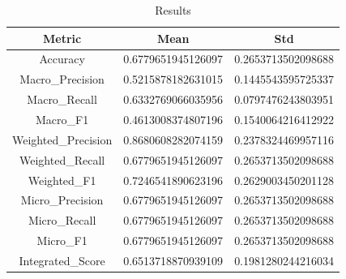 \begin{table}[htbp]
\centering
\caption{Results}
\label{tab:csv}
\small
\setlength{\tabcolsep}{4pt}
\begin{tabular}{|c|c|c|}
\hline
Metric & Mean & Std \\
\hline
Accuracy & 0.6779651945126097 & 0.2653713502098688 \\
Macro_Precision & 0.5215878182631015 & 0.1445543595725337 \\
Macro_Recall & 0.6332769066035956 & 0.0797476243803951 \\
Macro_F1 & 0.4613008374807196 & 0.1540064216412922 \\
Weighted_Precision & 0.8680608282074159 & 0.2378324469957116 \\
Weighted_Recall & 0.6779651945126097 & 0.2653713502098688 \\
Weighted_F1 & 0.7246541890623196 & 0.2629003450201128 \\
Micro_Precision & 0.6779651945126097 & 0.2653713502098688 \\
Micro_Recall & 0.6779651945126097 & 0.2653713502098688 \\
Micro_F1 & 0.6779651945126097 & 0.2653713502098688 \\
Integrated_Score & 0.6513718870939109 & 0.1981280244216034 \\
\hline
\end{tabular}
\end{table}